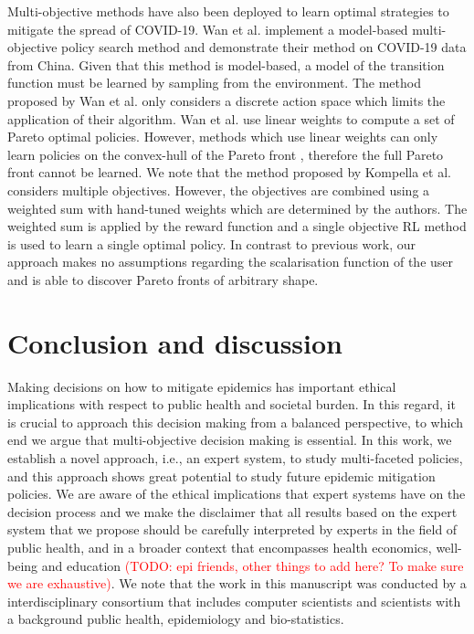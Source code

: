 \documentclass{article}
\renewcommand{\cite}[1]{\citep{#1}}
\newcommand\todo[1]{\textcolor{red}{(TODO: #1)}}
\begin{document}
Multi-objective methods have also been deployed to learn optimal strategies to mitigate the spread of COVID-19. Wan et al. \cite{wan2021multi} implement a model-based multi-objective policy search method and demonstrate their method on COVID-19 data from China. Given that this method is model-based, a model of the transition function must be learned by sampling from the environment. The method proposed by Wan et al. \cite{wan2021multi} only considers a discrete action space which limits the application of their algorithm. Wan et al. \cite{wan2021multi} use linear weights to compute a set of Pareto optimal policies. However, methods which use linear weights can only learn policies on the convex-hull of the Pareto front \cite{vamplew2008limitations}, therefore the full Pareto front cannot be learned. We note that the method proposed by Kompella et al. \cite{kompella2020reinforcement} considers multiple objectives. However, the objectives are combined using a weighted sum with hand-tuned weights which are determined by the authors. The weighted sum is applied by the reward function and a single objective RL method is used to learn a single optimal policy.
In contrast to previous work, our approach makes no assumptions regarding the scalarisation function of the user and is able to discover Pareto fronts of arbitrary shape.

\section{Conclusion and discussion}
Making decisions on how to mitigate epidemics has important ethical implications with respect to public health and societal burden. In this regard, it is crucial to approach this decision making from a balanced perspective, to which end we argue that multi-objective decision making is essential. In this work, we establish a novel approach, i.e., an expert system, to study multi-faceted policies, and this approach shows great potential to study future epidemic mitigation policies. We are aware of the ethical implications that expert systems have on the decision process and we make the disclaimer that all results based on the expert system that we propose should be carefully interpreted by experts in the field of public health, and in a broader context that encompasses health economics, well-being and education \todo{epi friends, other things to add here? To make sure we are exhaustive}. We note that the work in this manuscript was conducted by a interdisciplinary consortium that includes computer scientists and scientists with a background public health, epidemiology and bio-statistics.
\end{document}
